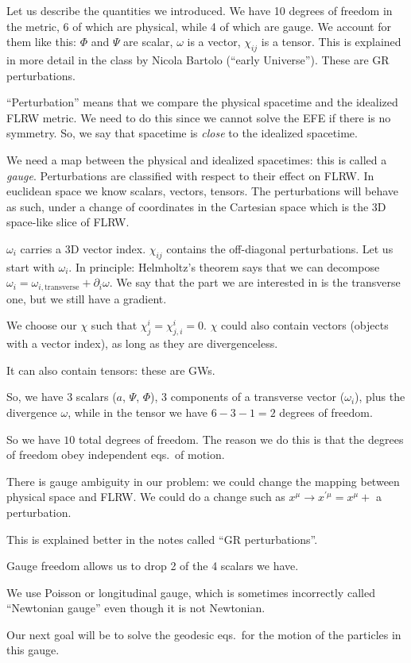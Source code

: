 \documentclass[main.tex]{subfiles}
\begin{document}
Let us describe the quantities we introduced.
We have 10 degrees of freedom in the metric, 6 of which are physical, while 4 of which are gauge.
We account for them like this: \(\Phi \) and \(\Psi \) are scalar, \(\omega \) is a vector, \(\chi_{ij}\) is a tensor. 
This is explained in more detail in the class by Nicola Bartolo (``early Universe''). These are GR perturbations. 

``Perturbation'' means that we compare the physical spacetime and the idealized FLRW metric. 
We need to do this since we cannot solve the EFE if there is no symmetry. 
So, we say that spacetime is \emph{close} to the idealized spacetime. 

We need a map between the physical and idealized spacetimes: this is called a \emph{gauge}. 
Perturbations are classified with respect to their effect on FLRW. 
In euclidean space we know scalars, vectors, tensors. 
The perturbations will behave as such, under a change of coordinates in the Cartesian space which is the 3D space-like slice of FLRW. 

\(\omega_{i}\) carries a 3D vector index. 
\(\chi_{ij}\) contains the off-diagonal perturbations. 
Let us start with  \(\omega_{i}\). In principle: Helmholtz's theorem says that we can decompose \(\omega_{i} = \omega_{i, \text{transverse}} + \partial_{i} \omega \).
We say that the part we are interested in is the transverse one, but we still have a gradient. 

We choose our \(\chi \) such that \(\chi^{i}_{j} = \chi^{i}_{j, i} =0\). 
\(\chi \) could also contain vectors (objects with a vector index), as long as they are divergenceless. 

It can also contain tensors: these are GWs. 

So, we have 3 scalars (\(a\), \(\Psi \), \(\Phi \)), 3 components of a transverse vector (\(\omega_{i}\)), plus the divergence \(\omega \), while in the tensor we have \(6 - 3- 1 = 2\) degrees of freedom. 

So we have \(10\) total degrees of freedom. 
The reason we do this is that the degrees of freedom obey independent eqs.\ of motion. 

There is gauge ambiguity in our problem: we could change the mapping between physical space and FLRW. 
We could do a change such as \(x^{\mu } \rightarrow x^{\prime \mu } = x^{\mu } + \) a perturbation. 

This is explained better in the notes called ``GR perturbations''. 

Gauge freedom allows us to drop 2 of the 4 scalars we have. 

We use Poisson or longitudinal gauge, which is sometimes incorrectly called ``Newtonian gauge'' even though it is not Newtonian. 

Our next goal will be to solve the geodesic eqs.\  for the motion of the particles in this gauge. 
\end{document}

